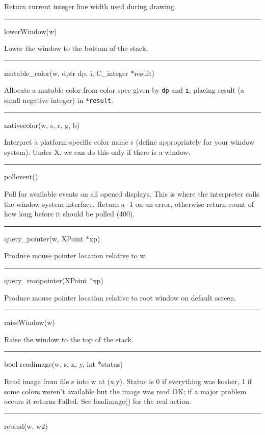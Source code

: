 Return current integer line width used during drawing.


\bigskip\hrule\vspace{0.1cm}
\noindent
lowerWindow(w)


Lower the window to the bottom of the stack.


\bigskip\hrule\vspace{0.1cm}
\noindent
mutable\_color(w, dptr dp, i, C\_integer *result)


Allocate a mutable color from color spec given by \texttt{dp} and
\texttt{i}, placing result (a small negative integer) in
\texttt{*result}.


\bigskip\hrule\vspace{0.1cm}
\noindent
nativecolor(w, s, r, g, b)


Interpret a platform-specific color name s (define appropriately for
your window system). Under X, we can do this only if there is a
window.


\bigskip\hrule\vspace{0.1cm}
\noindent
pollevent()


Poll for available events on all opened displays. This is where the
interpreter calls the window system interface. Return a -1 on an
error, otherwise return count of how long before it should be polled
(400).


\bigskip\hrule\vspace{0.1cm}
\noindent
query\_pointer(w, XPoint *xp)


Produce mouse pointer location relative to w.


\bigskip\hrule\vspace{0.1cm}
\noindent
query\_rootpointer(XPoint *xp)


Produce mouse pointer location relative to root window on default screen.


\bigskip\hrule\vspace{0.1cm}
\noindent
raiseWindow(w)


Raise the window to the top of the stack.


\bigskip\hrule\vspace{0.1cm}
\noindent
bool readimage(w, s, x, y, int *status)


Read image from file s into w at (x,y). Status is 0 if everything was
kosher, 1 if some colors weren't available but the image was read OK;
if a major problem occurs it returns Failed. See loadimage() for the
real action.


\bigskip\hrule\vspace{0.1cm}
\noindent
rebind(w, w2)


